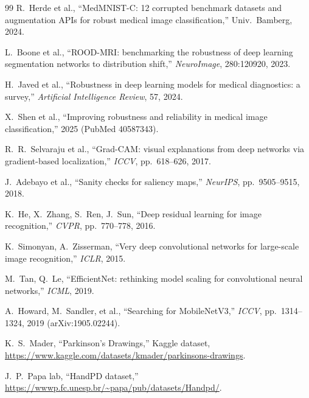 \documentclass[11pt,a4paper]{article}
\begin{document}
\begin{thebibliography}{99}
 R.~Herde et al., ``MedMNIST-C: 12 corrupted benchmark
datasets and augmentation APIs for robust medical image classification,''
Univ.\ Bamberg, 2024.

 L.~Boone et al., ``ROOD-MRI: benchmarking the robustness
of deep learning segmentation networks to distribution shift,'' \emph{NeuroImage}, 280:120920, 2023.

 H.~Javed et al., ``Robustness in deep learning models for
medical diagnostics: a survey,'' \emph{Artificial Intelligence Review}, 57,
2024.

 X.~Shen et al., ``Improving robustness and reliability in
medical image classification,'' 2025 (PubMed 40587343).

 R.~R.~Selvaraju et al., ``Grad-CAM: visual
explanations from deep networks via gradient-based localization,''
\emph{ICCV}, pp.~618--626, 2017.

 J.~Adebayo et al., ``Sanity checks for saliency
maps,'' \emph{NeurIPS}, pp.~9505--9515, 2018.

 K.~He, X.~Zhang, S.~Ren, J.~Sun, ``Deep residual learning
for image recognition,'' \emph{CVPR}, pp.~770--778, 2016.

 K.~Simonyan, A.~Zisserman, ``Very deep convolutional networks
for large-scale image recognition,'' \emph{ICLR}, 2015.

 M.~Tan, Q.~Le, ``EfficientNet: rethinking model
scaling for convolutional neural networks,'' \emph{ICML}, 2019.

 A.~Howard, M.~Sandler, et al., ``Searching for
MobileNetV3,'' \emph{ICCV}, pp.~1314--1324, 2019 (arXiv:1905.02244).

 K.~S.~Mader, ``Parkinson's Drawings,'' Kaggle
dataset, \url{https://www.kaggle.com/datasets/kmader/parkinsons-drawings}.

 J.~P.~Papa lab, ``HandPD dataset,''
\url{https://wwwp.fc.unesp.br/~papa/pub/datasets/Handpd/}.

\end{thebibliography}
\end{document}

